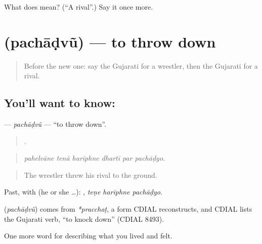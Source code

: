 \begin{tcolorbox}[breakable,colback=teal!4,colframe=teal!35!black,title={Before you move on}]
What does  mean? (\textquotedblleft{}A rival\textquotedblright{}.) Say it once more.
\end{tcolorbox}
\section[\texorpdfstring{\gu{પછાડવું} (pachāḍvũ)}{પછાડવું (pachāḍvũ)}]{ (pachāḍvũ) — to throw down}

\label{lesson:GU-C527-pachadvu}



\begin{quote}
Before the new one: say the Gujarati for a wrestler, then the Gujarati for a rival.
\end{quote}

\subsection*{You'll want to know: }
\textbf{} — \emph{pachāḍvũ} — \textquotedblleft{}to throw down\textquotedblright{}.

\begin{quote}
     .
\end{quote}

\begin{quote}
\emph{pahelvāne tenā harīphne dhartī par pachāḍyo.}
\end{quote}

\begin{quote}
The wrestler threw his rival to the ground.
\end{quote}

Past, with  (he or she …):   , \emph{teṇe harīphne pachāḍyo}.

\begin{cousinweb}
\textbf{} (\emph{pachāḍvũ}) comes from \emph{*pracchaṭ}, a form CDIAL reconstructs, and CDIAL lists the Gujarati verb, \textquotedblleft{}to knock down\textquotedblright{} (CDIAL 8493).
\end{cousinweb}

\begin{grammarlens}[title={What you've built}]
One more word for describing what you lived and felt.
\end{grammarlens}


